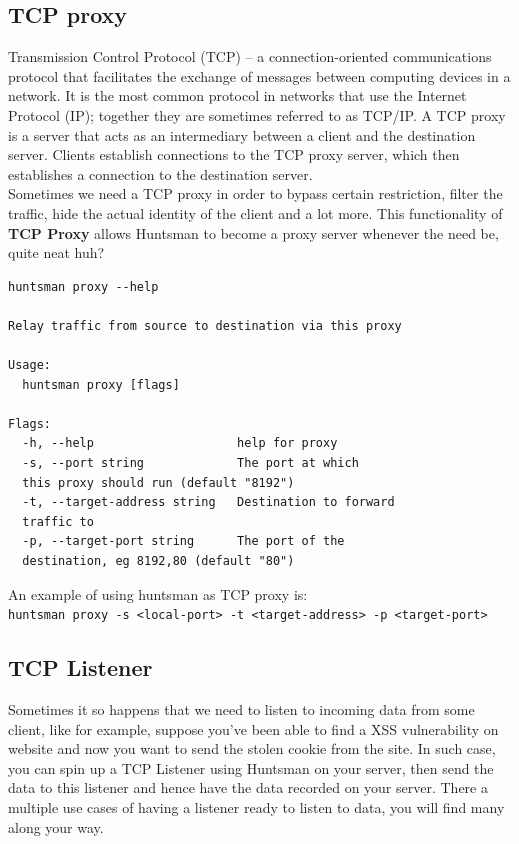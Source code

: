 \documentclass[12pt]{article}
\begin{document}
\subsection{TCP proxy}
Transmission Control Protocol (TCP) – a connection-oriented communications protocol that facilitates the exchange of messages between computing devices in a network. It is the most common protocol in networks that use the Internet Protocol (IP); together they are sometimes referred to as TCP/IP.
A TCP proxy is a server that acts as an intermediary between a client and the destination server. Clients establish connections to the TCP proxy server, which then establishes a connection to the destination server.\\
Sometimes we need a TCP proxy in order to bypass certain restriction, filter the traffic, hide the actual identity of the client and a lot more. This functionality of \textbf{TCP Proxy} allows Huntsman to become a proxy server whenever the need be, quite neat huh?
\begin{verbatim}
huntsman proxy --help                                      

Relay traffic from source to destination via this proxy

Usage:
  huntsman proxy [flags]

Flags:
  -h, --help                    help for proxy
  -s, --port string             The port at which 
  this proxy should run (default "8192")
  -t, --target-address string   Destination to forward 
  traffic to
  -p, --target-port string      The port of the 
  destination, eg 8192,80 (default "80")
\end{verbatim}

An example of using huntsman as TCP proxy is:\\
\verb|huntsman proxy -s <local-port> -t <target-address> -p <target-port>|

\subsection{TCP Listener}
Sometimes it so happens that we need to listen to incoming data from some client, like for example, suppose you've been able to find a XSS vulnerability on website and now you want to send the stolen cookie from the site. In such case, you can spin up a TCP Listener using Huntsman on your server, then send the data to this listener and hence have the data recorded on your server. There a multiple use cases of having a listener ready to listen to data, you will find many along your way.
\end{document}
